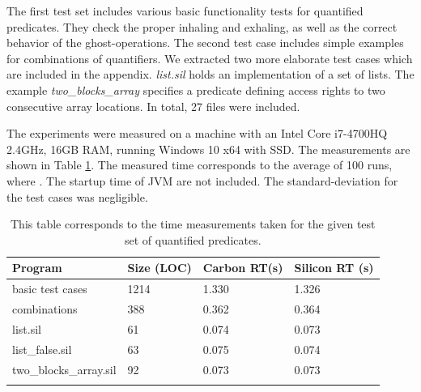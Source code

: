 \documentclass[12pt]{article}
\begin{document}
The first test set includes various basic functionality tests for quantified predicates. They check the proper inhaling and exhaling, as well as the correct behavior of the ghost-operations. The second test case includes simple examples for combinations of quantifiers. We extracted two more elaborate test cases which are included in the appendix. \textit{list.sil} holds an implementation of a set of lists. The example \textit{two\_blocks\_array} specifies a predicate defining access rights to two consecutive array locations. In total, 27 files were included.


The experiments were measured on a machine with an Intel Core i7-4700HQ 2.4GHz, 16GB RAM, running Windows 10 x64 with SSD. The measurements are shown in Table \ref{timings}. The measured time corresponds to the average of 100 runs, where . The startup time of JVM are not included. The standard-deviation for the test cases was negligible.

\begin{longtable}{ | p{} | p{}| p{} | p{}|}
\hline
{\bf Program} & {\bf Size (LOC)} & {\bf Carbon RT(s) }&  {\bf Silicon RT (s)} \\ \hline
basic test cases & 1214 & 1.330 & 1.326\\
\hline combinations & 388 & 0.362 & 0.364\\
\hline
list.sil & 61 & 0.074 & 0.073\\
list\_false.sil & 63 & 0.075 & 0.074\\
two\_blocks\_array.sil & 92 & 0.073 & 0.073\\

\hline
\caption[run-time measurements]
   {This table corresponds to the time measurements taken for the given test set of quantified predicates.}
\label{timings}
\end{longtable}
\end{document}
